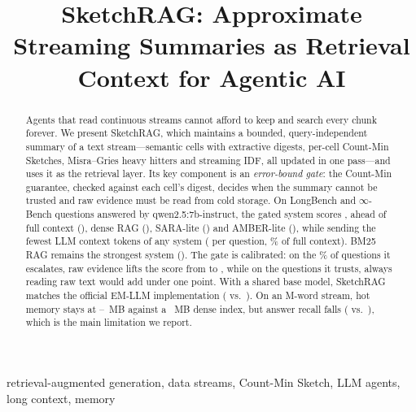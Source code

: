 \documentclass[conference,10pt]{IEEEtran}
\begin{document}
\title{SketchRAG: Approximate Streaming Summaries as Retrieval Context for Agentic AI}

\author{
\and
{}
\and
{}
\and
{}
}

\maketitle

\begin{abstract}
Agents that read continuous streams cannot afford to keep and search every chunk forever. We present SketchRAG, which
maintains a bounded, query-independent summary of a text stream---semantic cells with extractive digests, per-cell
Count-Min Sketches, Misra--Gries heavy hitters and streaming IDF, all updated in one pass---and uses it as the
retrieval layer. Its key component is an \emph{error-bound gate}: the Count-Min guarantee, checked against each cell's
digest, decides when the summary cannot be trusted and raw evidence must be read from cold storage. On \NQ{}
LongBench and $\infty$-Bench questions answered by qwen2.5:7b-instruct, the gated system scores \GateScore{}, ahead of
full context (\FullScore{}), dense RAG (\DenseScore{}), SARA-lite (\SaraScore{}) and AMBER-lite (\AmberScore{}), while
sending the fewest LLM context tokens of any system (\GateTok{} per question, \GateTokPct\% of full context). BM25 RAG
remains the strongest system (\BMScore{}). The gate is calibrated: on the \FiredPct\% of questions it escalates, raw
evidence lifts the score from \FiredSketch{} to \FiredGate{}, while on the questions it trusts, always reading raw text
would add under one point. With a shared base model, SketchRAG matches the official EM-LLM implementation (\EMGate{}
vs.\ \EMLLM{}). On an \StressMWords{}M-word stream, hot memory stays at \StressHotSixtyFour{}--\StressHotTwoFiftySix{}~MB
against a \StressDense{}~MB dense index, but answer recall falls (\RecSRGate{} vs.\ \RecDense{}), which is the main
limitation we report.
\end{abstract}

\begin{IEEEkeywords}
retrieval-augmented generation, data streams, Count-Min Sketch, LLM agents, long context, memory
\end{IEEEkeywords}
\end{document}
